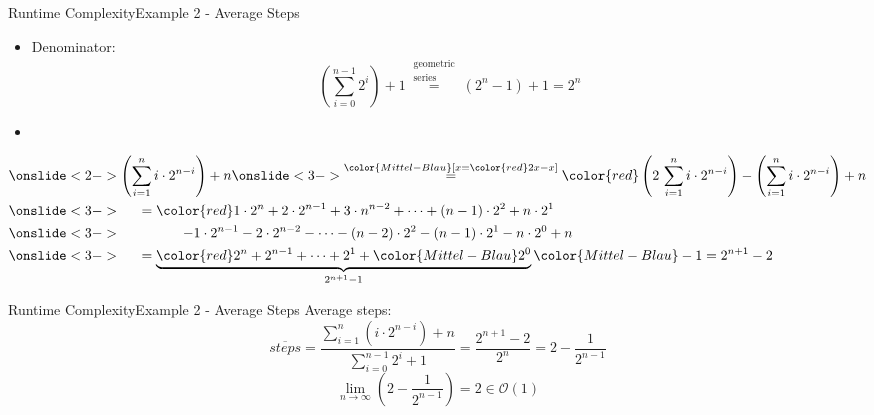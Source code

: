 \begin{frame}{Runtime Complexity}{Example 2 - Average Steps}
  \begin{itemize}
    \item
      Denominator:
      \begin{displaymath}
        \left(\sum_{i=0}^{n-1} 2^i \right) + 1
        \stackrel{\begin{array}{c}
          \text{geometric}\\
          \text{series}
        \end{array}}{=}
        (2^n - 1) + 1 = 2^n
      \end{displaymath}
    \item {}
  \end{itemize}
  \begin{alignat*}{4}
    & \onslide<2->{\left(\sum_{i=1}^n i \cdot 2^{n-i}\right) + n}
     \onslide<3->{\stackrel{\color{Mittel-Blau}[x = {\color{red}2x} - x]}{=}
        {\color{red}\left(2 \, \sum_{i=1}^n i \cdot 2^{n-i}\right)}
        - \left(\sum_{i=1}^n i \cdot 2^{n-i}\right) + n}\\
    &\onslide<3->{\hspace*{1.5em} = {\color{red}1 \cdot 2^n + 2 \cdot 2^{n-1} +
    3 \cdot n^{n-2} + \dots + (n-1) \cdot 2^2 + n \cdot 2^1}}\\
    & \onslide<3->{\hspace{4.5em}- 1 \cdot 2^{n-1} - 2 \cdot 2^{n-2} - \dots
        - (n-2) \cdot 2^2 - (n-1) \cdot 2^1 - n \cdot 2^0 + n}\\
    & \onslide<3->{\hspace*{1.5em} = \underbrace{{\color{red}2^n + 2^{n-1} +
    \dots +2^1} + {\color{Mittel-Blau}2^0}}_{2^{n+1}-1}{\color{Mittel-Blau} - 1}
      = 2^{n+1} - 2}
  \end{alignat*}
\end{frame}


\begin{frame}{Runtime Complexity}{Example 2 - Average Steps}
  {\color{Mittel-Blau}Average steps}:
  \begin{displaymath}
    \overline{steps}
    = \frac{
      \sum\limits_{i=1}^n \left(i \cdot 2^{n-i}\right) + n
    }{\sum\limits_{i=0}^{n-1} 2^i + 1}
    = \frac{2^{n+1} - 2}{2^n}
    = 2 - \frac{1}{2^{n-1}}
  \end{displaymath}
  \begin{displaymath}
    \lim_{n \to \infty} \left(2 - \frac{1}{2^{n-1}}\right) = 2
    \in \mathcal{O}(1)
  \end{displaymath}
\end{frame}

